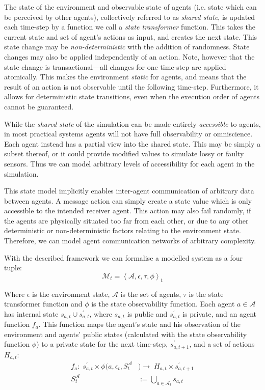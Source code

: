 The state of the environment and observable state of agents (i.e. state which
can be perceived by other agents), collectively referred to as \emph{shared
state}, is updated each time-step by a function we call a \emph{state
transformer} function. This takes the current state and set of agent's
actions as input, and creates the next state. This state change may be 
\emph{non-deterministic} with the addition of randomness. State changes may 
also be applied independently of an action. Note, however that the state change 
is transactional---all changes for one time-step are applied atomically. This
makes the environment \emph{static} for agents, and means that the result of
an action is not observable until the following time-step. Furthermore, it allows 
for deterministic state transitions, even when the execution order of agents 
cannot be guaranteed.

While the \emph{shared state} of the simulation can be made entirely
\emph{accessible} to agents, in most practical systems agents will not have
full observability or omniscience. Each agent instead has a partial view into
the shared state. This may be simply a subset thereof, or it could provide
modified values to simulate lossy or faulty sensors. Thus we can model
arbitrary levels of accessibility for each agent in the simulation.

This state model implicitly enables inter-agent communication of arbitrary
data between agents. A message action can simply create a state value which is
only accessible to the intended receiver agent. This action may also fail
randomly, if the agents are physically situated too far from each other, or due
to any other deterministic or non-deterministic factors relating to the environment
state. Therefore, we can model agent communication networks of arbitrary
complexity.


With the described framework we can formalise a modelled system as a four tuple:
\begin{equation*}
\mathcal{M}_{t}=\left\langle \mathcal{A},\epsilon,\tau,\phi \right\rangle _{t}
\end{equation*}

Where $\epsilon$ is the environment state, $\mathcal{A}$ is the set of agents, $\tau$ is the state transformer function and $\phi$ is the state observability function. Each
agent $a\in\mathcal{A}$ has internal state $s_{a,t}\cup s_{a,t}^{\prime}$,
where $s_{a,t}$ is public and $s_{a,t}^{\prime}$ is private, and
an agent function $f_{a}$. This function maps the agent's state and his observation of the environment and agents' public states (calculated with the state observability function $\phi$) to a private
state for the next time-step, $s_{a,t+1}^{\prime}$, and a set of actions
$H{}_{a,t}$:
\begin{align*}
f_{a}:\; s_{a,t}^{\prime} \times \phi(a, \epsilon_{t}, S_{t}^{\mathcal{A}}&) \rightarrow\; H_{a,t}\times s_{a,t+1}^{\prime}\\
S_{t}^{\mathcal{A}}&:=\bigcup_{a\in\mathcal{A}_{t}}s_{a,t}
\end{align*}

